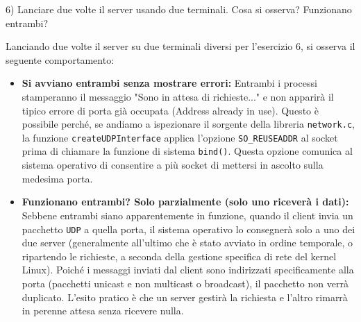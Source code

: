 \documentclass[11pt]{article}
\begin{document}
\begin{tcolorbox}[colback=blue!5!white,colframe=blue!75!black,title=\textbf{DOMANDA}, breakable]
6) Lanciare due volte il server usando due terminali. Cosa si osserva? Funzionano entrambi?
\end{tcolorbox}

\begin{tcolorbox}[colback=green!5!white,colframe=green!75!black,title=\textbf{RISPOSTA}, breakable]
Lanciando due volte il server su due terminali diversi per l'esercizio 6, si osserva il seguente comportamento:

\begin{itemize}
    \item \textbf{Si avviano entrambi senza mostrare errori:} Entrambi i processi stamperanno il messaggio "Sono in attesa di richieste..." e non apparirà il tipico errore di porta già occupata (Address already in use). Questo è possibile perché, se andiamo a ispezionare il sorgente della libreria \texttt{network.c}, la funzione \texttt{createUDPInterface} applica l'opzione \texttt{SO\_REUSEADDR} al socket prima di chiamare la funzione di sistema \texttt{bind()}. Questa opzione comunica al sistema operativo di consentire a più socket di mettersi in ascolto sulla medesima porta.
    
    \item \textbf{Funzionano entrambi? Solo parzialmente (solo uno riceverà i dati):} Sebbene entrambi siano apparentemente in funzione, quando il client invia un pacchetto \texttt{UDP} a quella porta, il sistema operativo lo consegnerà solo a uno dei due server (generalmente all'ultimo che è stato avviato in ordine temporale, o ripartendo le richieste, a seconda della gestione specifica di rete del kernel Linux). Poiché i messaggi inviati dal client sono indirizzati specificamente alla porta (pacchetti unicast e non multicast o broadcast), il pacchetto non verrà duplicato. L'esito pratico è che un server gestirà la richiesta e l'altro rimarrà in perenne attesa senza ricevere nulla.
\end{itemize}
\end{tcolorbox}
\end{document}
